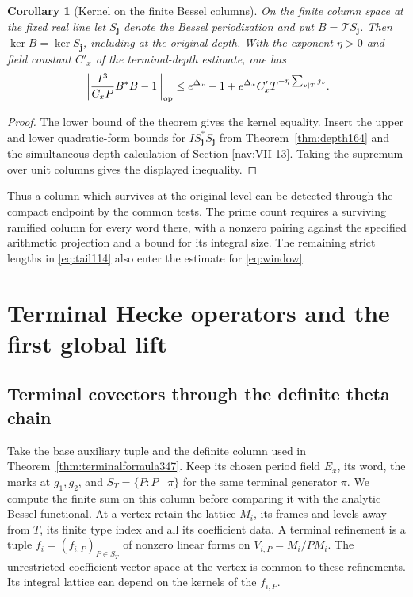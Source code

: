 \documentclass[a4paper,11pt]{article}
\newtheorem{corollary}[proposition]{Corollary}
\theoremstyle{definition}
\theoremstyle{remark}
\numberwithin{equation}{section}
\begin{document}
\begin{corollary}[Kernel on the finite Bessel columns]
\label{cor:common178}
On the finite column space at the fixed real line let
\(S_{\mathbf j}\) denote the Bessel periodization and put
\(B=\mathcal T S_{\mathbf j}\). Then
\(\ker B=\ker S_{\mathbf j}\), including at the original
depth. With the exponent \(\eta>0\) and field constant
\(C'_x\) of the terminal-depth estimate, one has
\[
 \left\|\frac{I^3}{C_x P} B^*B-1\right\|_{\rm op}
 \le e^{\Delta_x}-1+e^{\Delta_x}C'_x T^{-\eta\sum_{v\mid T}j_v}.
\]
\end{corollary}
\begin{proof}
The lower bound of the theorem gives the kernel equality.
Insert the upper and lower quadratic-form bounds for
\(I S_{\mathbf j}^*S_{\mathbf j}\) from
Theorem~\ref{thm:depth164} and the simultaneous-depth
calculation of Section \ref{nav:VII-13}. Taking the supremum
over unit columns gives the displayed inequality.
\end{proof}

Thus a column which survives at the original level can be
detected through the compact endpoint by the common tests.
The prime count requires a surviving ramified column for
every word there, with a nonzero pairing against the specified
arithmetic projection and a bound for its integral size. The
remaining strict lengths in \eqref{eq:tail114} also enter the
estimate for \eqref{eq:window}.

\section{Terminal Hecke operators and the first global lift}\label{nav:first-global-lift}

\subsection{Terminal covectors through the definite theta chain}\label{sec:covectorpaths352}

Take the base auxiliary tuple and the definite column used in
Theorem~\ref{thm:terminalformula347}. Keep its chosen period
field \(E_x\), its word, the marks at \(g_1,g_2\), and
\(S_T=\{P:P\mid\pi\}\) for the same terminal generator \(\pi\).
We compute the finite sum on this column before comparing it
with the analytic Bessel functional. At a vertex retain the
lattice \(M_i\), its frames and levels away from \(T\), its
finite type index and all its coefficient data. A terminal
refinement is a tuple \(f_i=(f_{i,P})_{P\in S_T}\) of nonzero
linear forms on \(V_{i,P}=M_i/PM_i\). The unrestricted
coefficient vector space at the vertex is common to these
refinements. Its integral lattice can depend on the kernels of
the \(f_{i,P}\).
\end{document}
